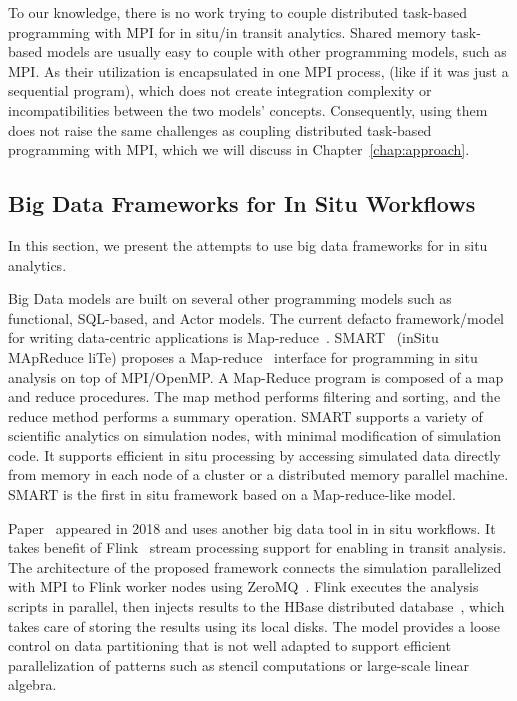 To our knowledge, there is no work trying to couple distributed task-based programming with MPI for in situ/in transit analytics.
Shared memory task-based models are usually easy to couple with other programming models, such as MPI. As their utilization is encapsulated in one MPI process, (like if it was just a sequential program), which does not create integration complexity or incompatibilities between the two models' concepts.  
Consequently, using them does not raise the same challenges as coupling distributed task-based programming with MPI, which we will discuss in Chapter~\ref{chap:approach}.


\subsection{Big Data Frameworks for In Situ Workflows}\label{sec:insitu:bigdata}

In this section, we present the attempts to use big data frameworks for in situ analytics.  

Big Data models are built on several other programming models such as functional, SQL-based, and Actor models. The current defacto framework/model for writing data-centric applications is Map-reduce~\cite{Wu2017}.
SMART~\cite{wang_smart_2015} (inSitu MApReduce liTe) proposes a Map-reduce~\cite{dean2008mapreduce} interface for programming in situ analysis on top of MPI/OpenMP. 
A Map-Reduce program is composed of a map and reduce procedures. The map method performs filtering and sorting, and the reduce method performs a summary operation. 
SMART supports a variety of scientific analytics on simulation nodes, with minimal modification of simulation code. It supports efficient in situ processing by accessing simulated data directly from memory in each node of a cluster or a distributed memory parallel machine. SMART is the first in situ framework based on a Map-reduce-like model.


Paper~\cite{zanuz_-transit_2018_flink} appeared in 2018 and uses another big data tool in in situ workflows. It takes benefit of Flink~\cite{carbone2015apache_flink, friedman2016introduction_flink} stream processing support for enabling in transit analysis.
The architecture of the proposed framework connects the 
simulation parallelized with MPI to Flink worker nodes using ZeroMQ~\cite{hintjens2013zeromq}. Flink executes the analysis scripts in parallel, then injects results to the HBase distributed database~\cite{vora2011hadoop}, which takes care of storing the results using its local disks. 
The model provides a loose control on data partitioning that is not well adapted to support efficient parallelization of patterns such as stencil computations\cite{arrayUDF-SC2018} or large-scale linear algebra.

